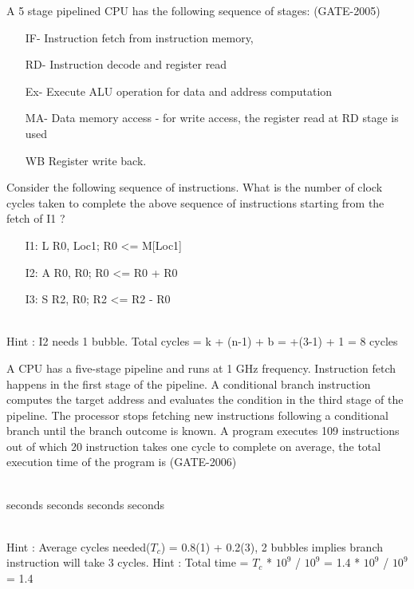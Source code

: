 \begin{questyle}
  \question  A 5 stage pipelined CPU has the following sequence of stages:  (GATE-2005)
  \begin{enumerate}
    \item[IF-] Instruction fetch from instruction memory,
    \item[RD-] Instruction decode and register read
    \item[Ex-] Execute ALU operation for data and address computation
    \item[MA-] Data memory access - for write access, the register read
     at RD stage is used
     \item[WB] Register write back.
  \end{enumerate}
  Consider the following sequence of instructions. What is the number of clock cycles taken to complete the above sequence of instructions starting from the fetch of I1 ?
  \begin{enumerate}
    \item[I1:] \quad L R0, Loc1; \quad R0 \textless= M[Loc1]
    \item[I2:] \quad A R0, R0; \quad \; \; R0 \textless= R0 + R0
    \item[I3:] \quad S R2, R0; \quad \; \; R2 \textless= R2 - R0
  \end{enumerate}

  \begin{oneparchoices}
  \end{oneparchoices} \\
  Hint : I2 needs 1 bubble. Total cycles = \quad k + (n-1) + b =  +(3-1) + 1 = 8 cycles
\end{questyle}

\begin{questyle}
  \question  A CPU has a five-stage pipeline and runs at 1 GHz frequency. Instruction fetch happens
             in the first stage of the pipeline. A conditional branch instruction computes the target
             address and evaluates the condition in the third stage of the pipeline. The processor stops
             fetching new instructions following a conditional branch until the branch outcome is known.
             A program executes 109 instructions out of which 20%
             instruction takes one cycle to complete on average, the total execution time of the program is  (GATE-2006)
  \begin{oneparchoices} \\
     seconds
     seconds
     seconds
     seconds
  \end{oneparchoices}\\
  Hint : Average cycles needed(\(T_c\)) = 0.8(1) + 0.2(3), 2 bubbles implies branch instruction will take 3 cycles.
  Hint : Total time = \(T_c\) * \(10^9\) / \(10^9\) = 1.4 * \(10^9\) / \(10^9\) = 1.4
\end{questyle}

